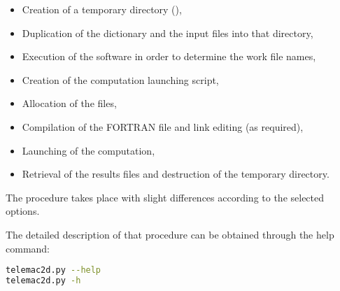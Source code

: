 \begin{itemize}
\item Creation of a temporary directory
(),

\item Duplication of the dictionary and the input files into that directory,

\item Execution of the \damo software in order to determine the work file names,

\item Creation of the computation launching script,

\item Allocation of the files,

\item Compilation of the FORTRAN file and link editing (as required),

\item Launching of the computation,

\item Retrieval of the results files and destruction of the temporary directory.
\end{itemize}

The procedure takes place with slight differences according to the selected
options.

The detailed description of that procedure can be obtained through the help
command:

\begin{lstlisting}[language=bash]
telemac2d.py --help
telemac2d.py -h
\end{lstlisting}
